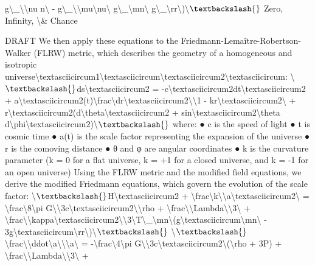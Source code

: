 \documentclass[12pt]{article}
\begin{document}
g\textbackslash{}_\textbackslash{}{\textbackslash{}nu n\textbackslash{}} - g\textbackslash{}_\textbackslash{}{\textbackslash{}mu\textbackslash{}nu\textbackslash{}} g\textbackslash{}_\textbackslash{}{mn\textbackslash{}} g\textbackslash{}_\textbackslash{}{rr\textbackslash{}})\textbackslash{}$\textbackslash{}$
Zero, Infinity, \textbackslash{}& Chance

DRAFT
We then apply these equations to the Friedmann-Lemaître-Robertson-Walker (FLRW)
metric, which describes the geometry of a homogeneous and isotropic
universe\textbackslash{}textasciicircum{}1\textbackslash{}textasciicircum{}\textbackslash{}textasciicircum{}2\textbackslash{}textasciicircum{}:
\textbackslash{}$\textbackslash{}$ds\textbackslash{}textasciicircum{}2 = -c\textbackslash{}textasciicircum{}2dt\textbackslash{}textasciicircum{}2 + a\textbackslash{}textasciicircum{}2(t)\textbackslash{}frac\textbackslash{}{dr\textbackslash{}textasciicircum{}2\textbackslash{}}\textbackslash{}{1 - kr\textbackslash{}textasciicircum{}2\textbackslash{}} + r\textbackslash{}textasciicircum{}2(d\textbackslash{}theta\textbackslash{}textasciicircum{}2 + sin\textbackslash{}textasciicircum{}2\textbackslash{}theta
d\textbackslash{}phi\textbackslash{}textasciicircum{}2)\textbackslash{}$\textbackslash{}$
where:
●
c is the speed of light
●
t is cosmic time
●
a(t) is the scale factor representing the expansion of the universe
●
r is the comoving distance
●
θ and φ are angular coordinates
●
k is the curvature parameter (k = 0 for a ﬂat universe, k = +1 for a closed
universe, and k = -1 for an open universe)
Using the FLRW metric and the modiﬁed ﬁeld equations, we derive the modiﬁed
Friedmann equations, which govern the evolution of the scale factor:
\textbackslash{}$\textbackslash{}$H\textbackslash{}textasciicircum{}2 + \textbackslash{}frac\textbackslash{}{k\textbackslash{}}\textbackslash{}{a\textbackslash{}textasciicircum{}2\textbackslash{}} = \textbackslash{}frac\textbackslash{}{8\textbackslash{}pi G\textbackslash{}}\textbackslash{}{3c\textbackslash{}textasciicircum{}2\textbackslash{}}\textbackslash{}rho + \textbackslash{}frac\textbackslash{}{\textbackslash{}Lambda\textbackslash{}}\textbackslash{}{3\textbackslash{}} +
\textbackslash{}frac\textbackslash{}{\textbackslash{}kappa\textbackslash{}textasciicircum{}2\textbackslash{}}\textbackslash{}{3\textbackslash{}}T\textbackslash{}_\textbackslash{}{mn\textbackslash{}}(g\textbackslash{}textasciicircum{}\textbackslash{}{mn\textbackslash{}} - 3g\textbackslash{}textasciicircum{}\textbackslash{}{rr\textbackslash{}})\textbackslash{}$\textbackslash{}$
\textbackslash{}$\textbackslash{}$\textbackslash{}frac\textbackslash{}{\textbackslash{}ddot\textbackslash{}{a\textbackslash{}}\textbackslash{}}\textbackslash{}{a\textbackslash{}} = -\textbackslash{}frac\textbackslash{}{4\textbackslash{}pi G\textbackslash{}}\textbackslash{}{3c\textbackslash{}textasciicircum{}2\textbackslash{}}(\textbackslash{}rho + 3P) + \textbackslash{}frac\textbackslash{}{\textbackslash{}Lambda\textbackslash{}}\textbackslash{}{3\textbackslash{}} +
\end{document}
